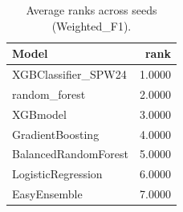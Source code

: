 \begin{table}[t]
\centering
\begin{tabular}{lr}
\toprule
Model & rank \\
\midrule
XGBClassifier_SPW24 & 1.0000 \\
random_forest & 2.0000 \\
XGBmodel & 3.0000 \\
GradientBoosting & 4.0000 \\
BalancedRandomForest & 5.0000 \\
LogisticRegression & 6.0000 \\
EasyEnsemble & 7.0000 \\
\bottomrule
\end{tabular}
\caption{Average ranks across seeds (Weighted_F1).}
\label{tab:avg_rank_Weighted_F1}
\end{table}